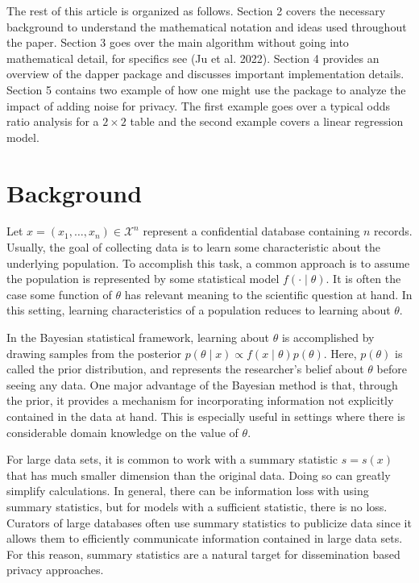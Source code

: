 The rest of this article is organized as follows. Section 2 covers the necessary background to understand the mathematical notation
and ideas used throughout the paper. Section 3 goes over the main algorithm without
going into mathematical detail, for specifics see (Ju et al. 2022). Section 4 provides
an overview of the dapper package and discusses important implementation details.
Section 5 contains two example of how one might use the package to analyze the
impact of adding noise for privacy. The first example goes over a typical
odds ratio analysis for a \(2 \times 2\) table and the second example
covers a linear regression model.

\hypertarget{background}{%
\section{Background}\label{background}}

Let \(x = (x_1, \ldots, x_n) \in \mathcal{X}^n\) represent a confidential
database containing \(n\) records. Usually, the goal of collecting data
is to learn some characteristic about the underlying population.
To accomplish this task, a common approach is to assume the population
is represented by some statistical model \(f( \cdot \mid \theta)\). It is often the case
some function of \(\theta\) has relevant meaning to the scientific question at hand. In this setting,
learning characteristics of a population reduces to learning about \(\theta\).

In the Bayesian statistical framework, learning about \(\theta\) is accomplished by drawing samples from the
posterior \(p(\theta \mid x) \propto f(x \mid \theta) p(\theta)\).
Here, \(p(\theta)\) is called the prior distribution, and represents
the researcher's belief about \(\theta\) before seeing any data.
One major advantage of the Bayesian method is that, through the prior,
it provides a mechanism for incorporating information not explicitly contained
in the data at hand. This is especially useful in settings where there
is considerable domain knowledge on the value of \(\theta\).

For large data sets, it is common to work with a summary statistic \(s = s(x)\)
that has much smaller dimension than the original data. Doing so can
greatly simplify calculations. In general, there can be information
loss with using summary statistics, but for models with a sufficient
statistic, there is no loss. Curators of large databases
often use summary statistics to publicize data since it allows them
to efficiently communicate information contained in large data sets.
For this reason, summary statistics are a natural target for
dissemination based privacy approaches.

